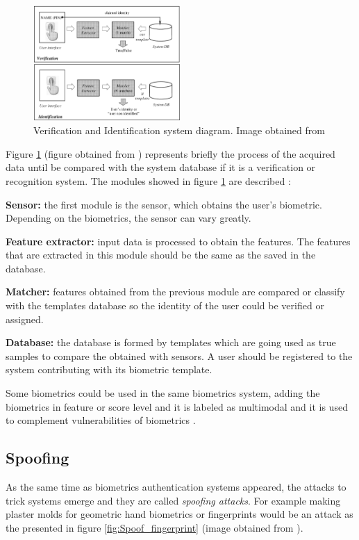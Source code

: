\begin{figure}[htb]
\centering
\includegraphics[width=0.5\textwidth]{images_miscelaneus/verif_identif.PNG}
\caption{Verification and Identification system diagram. Image obtained from \cite{Intro_biometrics2}} \label{fig:Verif_ident}
\end{figure}

Figure \ref{fig:Verif_ident} (figure obtained from \cite{Intro_biometrics2}) represents briefly the process of the acquired data until be compared  with the system database if it is a verification or recognition system. The modules showed in figure \ref{fig:Verif_ident} are described \cite{Intro_biometrics2}:
\begin{description}[noitemsep,topsep=8pt,parsep=0pt,partopsep=20pt]
\item \textbf{Sensor:} the first module is the sensor, which obtains the user's biometric. Depending on the biometrics, the sensor can vary greatly.
\item \textbf{Feature extractor:} input data is processed to obtain the features. The features that are extracted in this module should be the same as the saved in the database.
\item \textbf{Matcher:} features obtained from the previous module are compared or classify with the templates database so the identity of the user could be verified or assigned.
\item \textbf{Database:} the database is formed by templates which are going used as true samples to compare the obtained with sensors. A user should be registered to the system contributing with its biometric template.
\end{description}

Some biometrics could be used in the same biometrics system, adding the biometrics in feature or score level and it is labeled as multimodal and it is used to complement vulnerabilities of biometrics \cite{Spoofing_survey}.

\subsection{Spoofing}
As the same time as biometrics authentication systems appeared, the attacks to trick systems emerge and they are called \textit{spoofing attacks}. For example making plaster molds for geometric hand biometrics or fingerprints would be an attack as the presented in figure \ref{fig:Spoof_fingerprint} (image obtained from \cite{fingerprint_image}).\\

